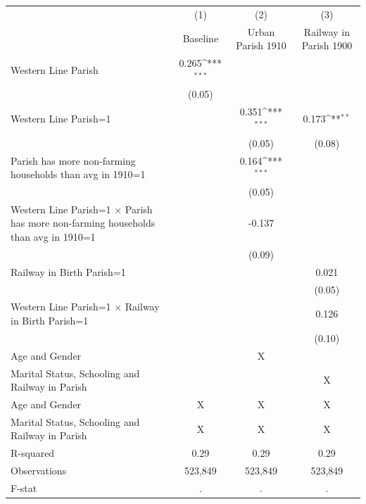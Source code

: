 {
\def\sym#1{\ifmmode^{#1}\else\(^{#1}\)\fi}
\begin{tabular}{l*{3}{c}}
\hline\hline
                    &\multicolumn{1}{c}{(1)}&\multicolumn{1}{c}{(2)}&\multicolumn{1}{c}{(3)}\\
                    &Baseline         &Urban Parish 1910         &Railway in Parish 1900         \\
\hline
Western Line Parish &       0.265\sym{***}&                     &                     \\
                    &      (0.05)         &                     &                     \\
Western Line Parish=1&                     &       0.351\sym{***}&       0.173\sym{**} \\
                    &                     &      (0.05)         &      (0.08)         \\
Parish has more non-farming households than avg in 1910=1&                     &       0.164\sym{***}&                     \\
                    &                     &      (0.05)         &                     \\
Western Line Parish=1 $\times$ Parish has more non-farming households than avg in 1910=1&                     &      -0.137         &                     \\
                    &                     &      (0.09)         &                     \\
Railway in Birth Parish=1&                     &                     &       0.021         \\
                    &                     &                     &      (0.05)         \\
Western Line Parish=1 $\times$ Railway in Birth Parish=1&                     &                     &       0.126         \\
                    &                     &                     &      (0.10)         \\
\hline
Age and Gender      &                     &           X         &                     \\
Marital Status, Schooling and Railway in Parish&                     &                     &           X         \\
\hline
Age and Gender      &           X         &           X         &           X         \\
Marital Status, Schooling and Railway in Parish&           X         &           X         &           X         \\
R-squared           &        0.29         &        0.29         &        0.29         \\
Observations        &     523,849         &     523,849         &     523,849         \\
F-stat              &           .         &           .         &           .         \\
\hline\hline
\end{tabular}
}
